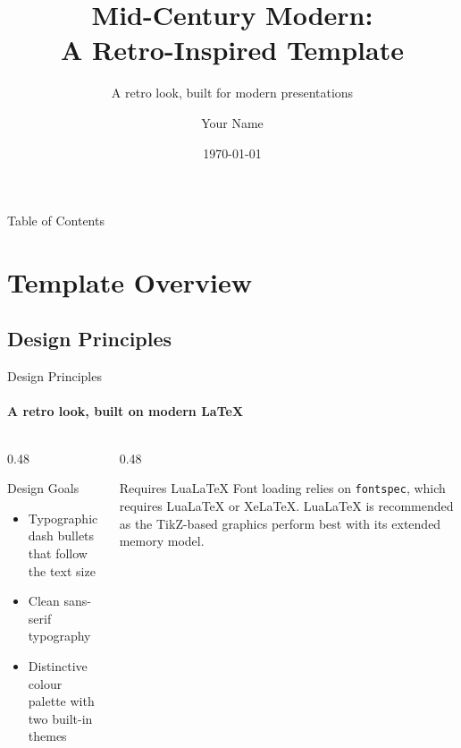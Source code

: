\documentclass[aspectratio=169]{beamer}
\title[Mid-Century Modern]{Mid-Century Modern:\\A Retro-Inspired Template}
\subtitle{A retro look, built for modern presentations}
\author{Your Name}
\institute{Your Institution}
\date{\today}
\begin{document}
\begin{frame}
  \titlepage
\end{frame}

\begin{frame}{Table of Contents}
  \tableofcontents
\end{frame}

\section{Template Overview}

\subsection{Design Principles}

\begin{frame}{Design Principles}
  \framesubtitle{A retro look, built on modern LaTeX}
  \begin{columns}[T]
    \begin{column}{0.48\textwidth}
      \begin{block}{Design Goals}
        \begin{itemize}
          \item Typographic dash bullets that follow the text size
          \item Clean sans-serif typography
          \item Distinctive colour palette with two built-in themes
        \end{itemize}
      \end{block}
    \end{column}
    \begin{column}{0.48\textwidth}
      \begin{alertblock}{Requires LuaLaTeX}
        Font loading relies on \texttt{fontspec}, which requires
        LuaLaTeX or XeLaTeX. LuaLaTeX is recommended as the
        TikZ-based graphics perform best with its extended memory
        model.
      \end{alertblock}
    \end{column}
  \end{columns}
\end{frame}
\end{document}
